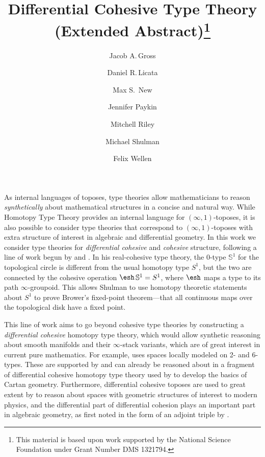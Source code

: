 \documentclass{article}
\title{Differential Cohesive Type Theory (Extended Abstract)\thanks{This
    material is based upon work supported by the National Science Foundation
    under Grant Number DMS 1321794.}}
\author{Jacob A.\,Gross}
\affil[1]{University of Pittsburgh}
\author[2]{Daniel R.\,Licata}
\affil[2]{Wesleyan University}
\author[3]{Max S.\, New}
\affil[3]{Northeastern University}
\author[4]{Jennifer Paykin}
\affil[4]{University of Pennsylvania}
\author[2]{Mitchell Riley}
\author[5]{Michael Shulman}
\affil[5]{University of San Diego}
\author[6]{Felix Wellen}
\affil[6]{Karlsruhe Institute of Technology}
\date{}
\begin{document}
\maketitle



As internal languages of toposes, type theories allow mathematicians to
reason \emph{synthetically} about mathematical structures in a concise and
natural way. While Homotopy Type Theory provides an internal language for
$(\infty,1)$-toposes, it is also possible to consider type theories that
correspond to $(\infty,1)$-toposes with extra structure of interest in algebraic
and differential geometry. In this work we consider type theories for
\emph{differential cohesive} and \emph{cohesive} structure, following a line of
work begun by \citet{Shulman2015} and \citet{Licata2016}.
In his real-cohesive type theory, the 0-type $\mathbb S^1$ for the topological
circle is different from the usual homotopy type $S^1$, but the two are
connected by the cohesive operation $\shape\,\mathbb S^1=S^1$, where $\shape$
maps a type to its path $\infty$-groupoid. This allows Shulman to use homotopy
theoretic statements about $S^1$ to prove Brower's fixed-point theorem---that
all continuous maps over the topological disk have a fixed point.


This line of work aims to go beyond cohesive type theories by constructing a
\emph{differential cohesive} homotopy type theory, which would allow synthetic
reasoning about smooth manifolds and their $\infty$-stack variants, which are of
great interest in current pure mathematics. For example,
\citet{SatiSchreiberStasheff2012} uses spaces locally modeled on 2- and 6-types.
These are supported by and can already be reasoned about in a fragment of
differential cohesive homotopy type theory used by \cite{Wellen2017} to develop
the basics of Cartan geometry. Furthermore, differential cohesive toposes are
used to great extent by \citet{Schreiber2013} to reason about spaces with
geometric structures of interest to modern physics, and the differential part of
differential cohesion plays an important part in algebraic geometry, as first
noted in the form of an adjoint triple by \citet{SimpsonTeleman}.
\end{document}
